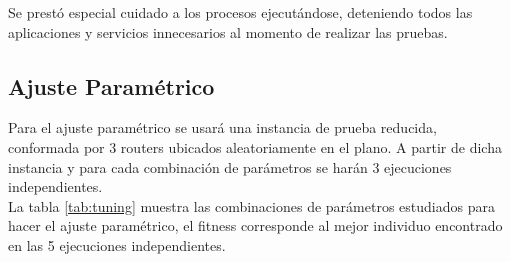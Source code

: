 \documentclass[journal]{IEEEtran}
\begin{document}
Se prestó especial cuidado a los procesos ejecutándose, deteniendo todos las aplicaciones y servicios innecesarios al momento de realizar las pruebas.

\subsection{Ajuste Paramétrico}

Para el ajuste paramétrico se usará una instancia de prueba reducida, conformada por 3 routers ubicados aleatoriamente en el plano. A partir de dicha instancia y para cada combinación de parámetros se harán 3 ejecuciones independientes.\\

La tabla \ref{tab:tuning} muestra las combinaciones de parámetros estudiados para hacer el ajuste paramétrico, el fitness corresponde al mejor individuo encontrado en las 5 ejecuciones independientes.
\end{document}
